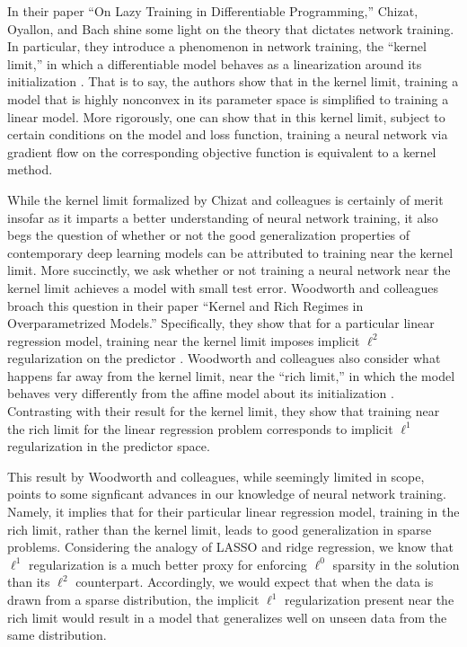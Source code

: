 \documentclass{article}
\begin{document}
In their paper \enquote{On Lazy Training in Differentiable Programming,} Chizat, Oyallon, and Bach shine some light on the theory that dictates network training. In particular, they introduce a phenomenon in network training, the \enquote{kernel limit,} in which a differentiable model behaves as a linearization around its initialization \cite{chizat2019lazy}. That is to say, the authors show that in the kernel limit, training a model that is highly nonconvex in its parameter space is simplified to training a linear model. More rigorously, one can show that in this kernel limit, subject to certain conditions on the model and loss function, training a neural network via gradient flow on the corresponding objective function is equivalent to a kernel method.

While the kernel limit formalized by Chizat and colleagues is certainly of merit insofar as it imparts a better understanding of neural network training, it also begs the question of whether or not the good generalization properties of contemporary deep learning models can be attributed to training near the kernel limit. More succinctly, we ask whether or not training a neural network near the kernel limit achieves a model with small test error. Woodworth and colleagues broach this question in their paper \enquote{Kernel and Rich Regimes in Overparametrized Models.} Specifically, they show that for a particular linear regression model, training near the kernel limit imposes implicit $\ell^2$ regularization on the predictor \cite{woodworth2020kernel}. Woodworth and colleagues also consider what happens far away from the kernel limit, near the \enquote{rich limit,} in which the model behaves very differently from the affine model about its initialization \cite{woodworth2020kernel}. Contrasting with their result for the kernel limit, they show that training near the rich limit for the linear regression problem corresponds to implicit $\ell^1$ regularization in the predictor space.

This result by Woodworth and colleagues, while seemingly limited in scope, points to some signficant advances in our knowledge of neural network training. Namely, it implies that for their particular linear regression model, training in the rich limit, rather than the kernel limit, leads to good generalization in sparse problems. Considering the analogy of LASSO and ridge regression, we know that $\ell^1$ regularization is a much better proxy for enforcing $\ell^0$ sparsity in the solution than its $\ell^2$ counterpart. Accordingly, we would expect that when the data is drawn from a sparse distribution, the implicit $\ell^1$ regularization present near the rich limit would result in a model that generalizes well on unseen data from the same distribution.
\end{document}
